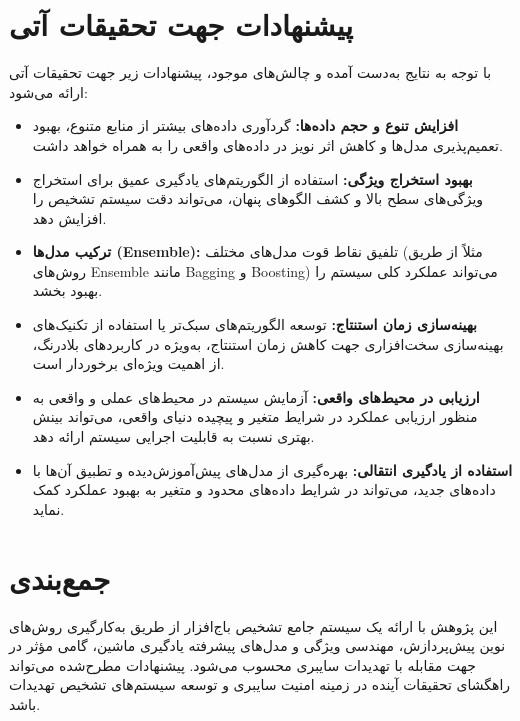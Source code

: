\section{پیشنهادات جهت تحقیقات آتی}
با توجه به نتایج به‌دست آمده و چالش‌های موجود، پیشنهادات زیر جهت تحقیقات آتی ارائه می‌شود:
\begin{itemize}
    \item \textbf{افزایش تنوع و حجم داده‌ها:} گردآوری داده‌های بیشتر از منابع متنوع، بهبود تعمیم‌پذیری مدل‌ها و کاهش اثر نویز در داده‌های واقعی را به همراه خواهد داشت.
    \item \textbf{بهبود استخراج ویژگی:} استفاده از الگوریتم‌های یادگیری عمیق برای استخراج ویژگی‌های سطح بالا و کشف الگوهای پنهان، می‌تواند دقت سیستم تشخیص را افزایش دهد.
    \item \textbf{ترکیب مدل‌ها (Ensemble):} تلفیق نقاط قوت مدل‌های مختلف (مثلاً از طریق روش‌های Ensemble مانند Bagging و Boosting) می‌تواند عملکرد کلی سیستم را بهبود بخشد.
    \item \textbf{بهینه‌سازی زمان استنتاج:} توسعه الگوریتم‌های سبک‌تر یا استفاده از تکنیک‌های بهینه‌سازی سخت‌افزاری جهت کاهش زمان استنتاج، به‌ویژه در کاربردهای بلادرنگ، از اهمیت ویژه‌ای برخوردار است.
    \item \textbf{ارزیابی در محیط‌های واقعی:} آزمایش سیستم در محیط‌های عملی و واقعی به منظور ارزیابی عملکرد در شرایط متغیر و پیچیده دنیای واقعی، می‌تواند بینش بهتری نسبت به قابلیت اجرایی سیستم ارائه دهد.
    \item \textbf{استفاده از یادگیری انتقالی:} بهره‌گیری از مدل‌های پیش‌آموزش‌دیده و تطبیق آن‌ها با داده‌های جدید، می‌تواند در شرایط داده‌های محدود و متغیر به بهبود عملکرد کمک نماید.
\end{itemize}

\section{جمع‌بندی}
این پژوهش با ارائه یک سیستم جامع تشخیص باج‌افزار از طریق به‌کارگیری روش‌های نوین پیش‌پردازش، مهندسی ویژگی و مدل‌های پیشرفته یادگیری ماشین، گامی مؤثر در جهت مقابله با تهدیدات سایبری محسوب می‌شود. پیشنهادات مطرح‌شده می‌تواند راهگشای تحقیقات آینده در زمینه امنیت سایبری و توسعه سیستم‌های تشخیص تهدیدات باشد.
